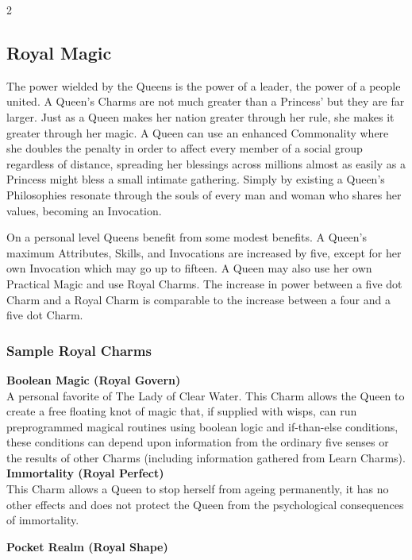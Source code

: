 \begin{multicols}{2}
\subsection*{Royal Magic}

The power wielded by the Queens is the power of a leader, the power of a people united. A Queen's Charms are not much greater than a Princess' but they are far larger. Just as a Queen makes her nation greater through her rule, she makes it greater through her magic. A Queen can use an enhanced Commonality where she doubles the penalty in order to affect every member of a social group regardless of distance, spreading her blessings across millions almost as easily as a Princess might bless a small intimate gathering. Simply by existing a Queen's Philosophies resonate through the souls of every man and woman who shares her values, becoming an Invocation. 

On a personal level Queens benefit from some modest benefits. A Queen's maximum Attributes, Skills, and Invocations are increased by five, except for her own Invocation which may go up to fifteen. A Queen may also use her own Practical Magic and use Royal Charms. The increase in power between a five dot Charm and a Royal Charm is comparable to the increase between a four and a five dot Charm.

\subsubsection*{Sample Royal Charms}

\textbf{Boolean Magic (Royal Govern)}\\

\noindent A personal favorite of The Lady of Clear Water. This Charm allows the Queen to create a free floating knot of magic that, if supplied with wisps, can run preprogrammed magical routines using boolean logic and if-than-else conditions, these conditions can depend upon information from the ordinary five senses or the results of other Charms (including information gathered from Learn Charms).\\

\noindent \textbf{Immortality (Royal Perfect)}\\

\noindent This Charm allows a Queen to stop herself from ageing permanently, it has no other effects and does not protect the Queen from the psychological consequences of immortality.

\noindent \textbf{Pocket Realm (Royal Shape)}\\


\end{multicols}
